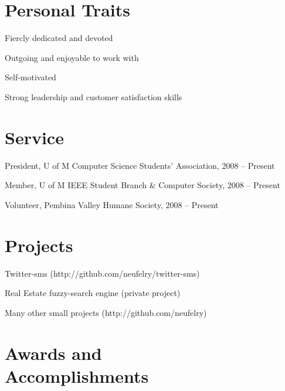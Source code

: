 \documentclass[margin,line,letterpaper]{resume}
\begin{document}
\begin{resume}
  \section{\mysidestyle Personal Traits}

  \begin{list2}
    \item Fiercly dedicated and devoted
    \item Outgoing and enjoyable to work with
    \item Self-motivated
    \item Strong leadership and customer satisfaction skills
  \end{list2}

  \section{\mysidestyle Service}

  \begin{list2}
    \item President, U of M Computer Science Students' Association, 2008 -- Present
    \item Member, U of M IEEE Student Branch \& Computer Society, 2008 -- Present
    \item Volunteer, Pembina Valley Humane Society, 2008 -- Present
  \end{list2}

  \newpage
  \section{\mysidestyle Projects}

  \begin{list2}
    \item Twitter-sms (http://github.com/neufelry/twitter-sms)
    \item Real Estate fuzzy-search engine (private project)
    \item Many other small projects (http://github.com/neufelry)
  \end{list2}


  \section{\mysidestyle Awards and\\Accomplishments}


\end{resume}
\end{document}
